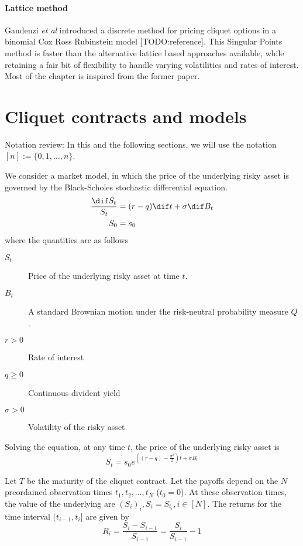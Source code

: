 \paragraph{Lattice method}
Gaudenzi \textit{et al}\cite{Gaudenzi2011} introduced a discrete method for pricing cliquet options in a binomial Cox Ross Rubinstein model [TODO:reference]. This Singular Points method is faster than the alternative lattice based approaches available, while retaining a fair bit of flexibility to handle varying volatilities and rates of interest. Most of the chapter is inspired from the former paper.


\section{Cliquet contracts and models}
\label{sec:sp-clq-models}

Notation review: In this and the following sections, we will use the notation $ [n] := \{ 0, 1, \dots, n \} $.

We consider a market model, in which the price of the underlying risky asset is governed by the Black-Scholes stochastic differential equation.
\begin{subequations}
	\label{eq:black-scholes}
	\begin{align}
		\frac{\dif S_t}{S_t} &= (r - q) \dif t + \sigma \dif B_t \\
		S_0 &= s_0		
	\end{align}
\end{subequations}
where the quantities are as follows
\begin{description}
	\item[$ S_t $] Price of the underlying risky asset at time $t$.
	\item[$B_t$] A standard Brownian motion under the risk-neutral probability measure $Q$.
	\item[$ r > 0 $] Rate of interest
	\item[$ q \ge 0 $] Continuous divident yield
	\item[$ \sigma > 0 $] Volatility of the risky asset
\end{description}

Solving the equation, at any time $ t $, the price of the underlying risky asset is
\begin{equation*}
	\label{eq:sp-clq-risky-prc}
	S_t = s_0 e^{ ( (r - q) - \frac{\sigma^2}{2} )t + \sigma B_t }
\end{equation*}

Let $T$ be the maturity of the cliquet contract. Let the payoffs depend on the $ N $ preordained observation times $ t_1, t_2, \dots, t_{N} $ ($ t_0 = 0 $). At these observation times, the value of the underlying are $ ( S_i )_i, S_i = S_{t_i}, i \in \left[ N \right] $. The returns for the time interval $ ( t_{i-1}, t_i ] $ are given by
\begin{equation}
	\label{eq:sp-clq-return}
	R_i = \frac{S_i - S_{i-1}}{S_{i-1}} = \frac{S_i}{S_{i-1}} - 1
\end{equation}

